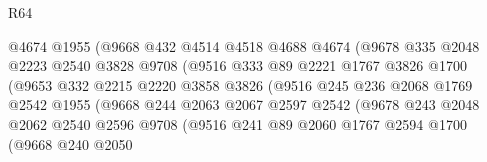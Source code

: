 \begin{lexlean}{R64}
\begin{coremodule}
                              @4674
                              @1955
                              (@9668
                                @432
                                @4514
                                @4518
                                @4688
                                @4674
                                (@9678
                                  @335
                                  @2048
                                  @2223
                                  @2540
                                  @3828
                                  @9708
                                  (@9516
                                    @333
                                    @89
                                    @2221
                                    @1767
                                    @3826
                                    @1700
                                    (@9653
                                      @332
                                      @2215
                                      @2220
                                      @3858
                                      @3826
                                      (@9516
                                        @245
                                        @236
                                        @2068
                                        @1769
                                        @2542
                                        @1955
                                        (@9668
                                          @244
                                          @2063
                                          @2067
                                          @2597
                                          @2542
                                          (@9678
                                            @243
                                            @2048
                                            @2062
                                            @2540
                                            @2596
                                            @9708
                                            (@9516
                                              @241
                                              @89
                                              @2060
                                              @1767
                                              @2594
                                              @1700
                                              (@9668
                                                @240
                                                @2050

\end{coremodule}
\end{lexlean}
